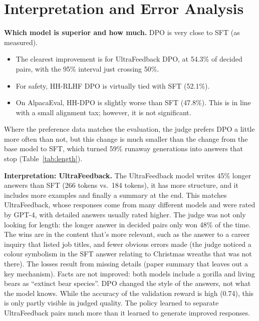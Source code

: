 \documentclass[10pt]{article}
\begin{document}
\section{Interpretation and Error Analysis}

\textbf{Which model is superior and how much.} DPO is very close to SFT (as measured).
\begin{itemize}
\item The clearest improvement is for UltraFeedback DPO, at 54.3\% of decided pairs, with the 95\% interval just crossing 50\%.
\item For safety, HH-RLHF DPO is virtually tied with SFT (52.1\%).
\item On AlpacaEval, HH-DPO is slightly worse than SFT (47.8\%). This is in line with a small alignment tax; however, it is not significant.
\end{itemize}
Where the preference data matches the evaluation, the judge prefers DPO a little more often than not, but this change is much smaller than the change from the base model to SFT, which turned 59\% runaway generations into answers that stop (Table~\ref{tab:length}).

\textbf{Interpretation: UltraFeedback.} The UltraFeedback model writes 45\% longer answers than SFT (266 tokens vs.\ 184 tokens), it has more structure, and it includes more examples and finally a summary at the end. This matches UltraFeedback, whose responses come from many different models and were rated by GPT-4, with detailed answers usually rated higher.
The judge was not only looking for length: the longer answer in decided pairs only won 48\% of the time.
The wins are in the content that's more relevant, such as the answer to a career inquiry that listed job titles, and fewer obvious errors made (the judge noticed a colour symbolism in the SFT answer relating to Christmas wreaths that was not there).
The losses result from missing details (paper summary that leaves out a key mechanism). Facts are not improved: both models include a gorilla and living bears as ``extinct bear species''. DPO changed the style of the answers, not what the model knows.
While the accuracy of the validation reward is high (0.74), this is only partly visible in judged quality. The policy learned to separate UltraFeedback pairs much more than it learned to generate improved responses.
\end{document}
